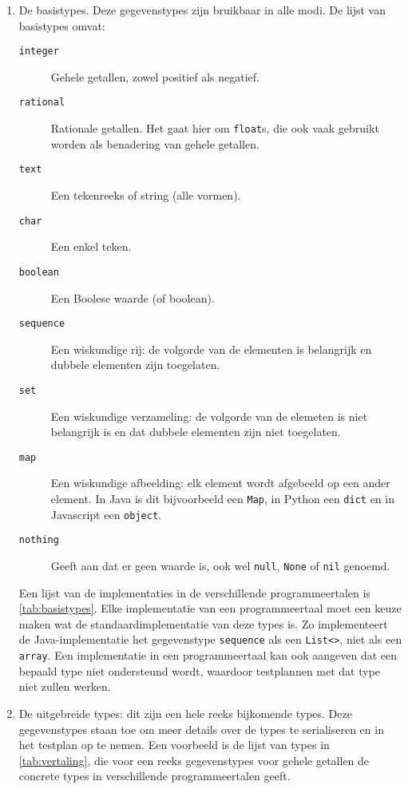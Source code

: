 \begin{enumerate}
    \item De basistypes.
    Deze gegevenstypes zijn bruikbaar in alle modi.
    De lijst van basistypes omvat:
    \begin{description}
        \item[\texttt{integer}] Gehele getallen, zowel positief als negatief.
        \item[\texttt{rational}] Rationale getallen.
        Het gaat hier om \texttt{float}s, die ook vaak gebruikt worden als benadering van gehele getallen.
        \item[\texttt{text}] Een tekenreeks of string (alle vormen).
        \item[\texttt{char}] Een enkel teken.
        \item[\texttt{boolean}] Een Boolese waarde (of boolean).
        \item[\texttt{sequence}] Een wiskundige rij: de volgorde van de elementen is belangrijk en dubbele elementen zijn toegelaten.
        \item[\texttt{set}] Een wiskundige verzameling: de volgorde van de elemeten is niet belangrijk is en dat dubbele elementen zijn niet toegelaten.
        \item[\texttt{map}] Een wiskundige afbeelding: elk element wordt afgebeeld op een ander element.
        In Java is dit bijvoorbeeld een \texttt{Map}, in Python een \texttt{dict} en in Javascript een \texttt{object}.
        \item[\texttt{nothing}] Geeft aan dat er geen waarde is, ook wel \texttt{null}, \texttt{None} of \texttt{nil} genoemd.
    \end{description}
    Een lijst van de implementaties in de verschillende programmeertalen is \cref{tab:basistypes}.
    Elke implementatie van een programmeertaal moet een keuze maken wat de standaardimplementatie van deze types is.
    Zo implementeert de Java-implementatie het gegevenstype \texttt{sequence} als een \texttt{List<>}, niet als een \texttt{array}.
    Een implementatie in een programmeertaal kan ook aangeven dat een bepaald type niet ondersteund wordt, waardoor testplannen met dat type niet zullen werken.
    \item De uitgebreide types: dit zijn een hele reeks bijkomende types.
    Deze gegevenstypes staan toe om meer details over de types te serialiseren en in het testplan op te nemen.
    Een voorbeeld is de lijst van types in \cref{tab:vertaling}, die voor een reeks gegevenstypes voor gehele getallen de concrete types in verschillende programmeertalen geeft.

\end{enumerate}
